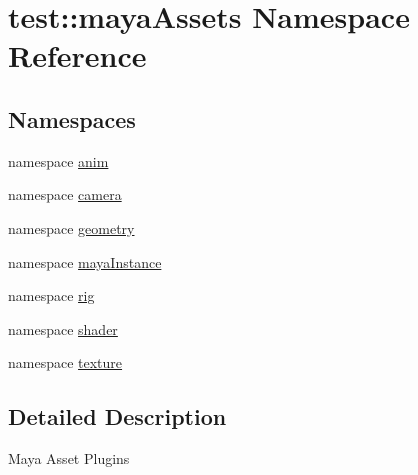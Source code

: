 \hypertarget{namespacetest_1_1mayaAssets}{\section{test\-:\-:maya\-Assets \-Namespace \-Reference}
\label{d1/d5f/namespacetest_1_1mayaAssets}
}
\subsection*{\-Namespaces}
\begin{DoxyCompactItemize}
\item 
namespace \hyperlink{namespacetest_1_1mayaAssets_1_1anim}{anim}
\item 
namespace \hyperlink{namespacetest_1_1mayaAssets_1_1camera}{camera}
\item 
namespace \hyperlink{namespacetest_1_1mayaAssets_1_1geometry}{geometry}
\item 
namespace \hyperlink{namespacetest_1_1mayaAssets_1_1mayaInstance}{maya\-Instance}
\item 
namespace \hyperlink{namespacetest_1_1mayaAssets_1_1rig}{rig}
\item 
namespace \hyperlink{namespacetest_1_1mayaAssets_1_1shader}{shader}
\item 
namespace \hyperlink{namespacetest_1_1mayaAssets_1_1texture}{texture}
\end{DoxyCompactItemize}


\subsection{\-Detailed \-Description}
\begin{DoxyVerb}
Maya Asset Plugins
\end{DoxyVerb}
 